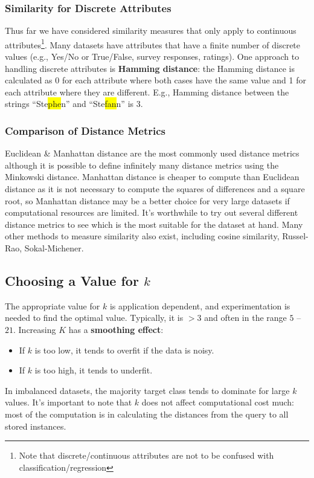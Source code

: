 \documentclass[a4paper,11pt]{article}
\begin{document}
\subsubsection{Similarity for Discrete Attributes}
Thus far we have considered similarity measures that only apply to continuous attributes\footnote{Note that discrete/continuous attributes are not to be confused with classification/regression}.
Many datasets have attributes that have a finite number of discrete values (e.g., Yes/No or True/False, survey responses, ratings).
One approach to handling discrete attributes is \textbf{Hamming distance}: the Hamming distance is calculated as 0 for each attribute where both cases have the same value and 1 for each attribute where they are different.
E.g., Hamming distance between the strings ``Ste\colorbox{yellow}{phe}n'' and ``Ste\colorbox{yellow}{fan}n'' is 3.

\subsubsection{Comparison of Distance Metrics}
Euclidean \& Manhattan distance are the most commonly used distance metrics although it is possible to define infinitely many distance metrics using the Minkowski distance.
Manhattan distance is cheaper to compute than Euclidean distance as it is not necessary to compute the squares of differences and a square root, so Manhattan distance may be a better choice for very large datasets if computational resources are limited.
It's worthwhile to try out several different distance metrics to see which is the most suitable for the dataset at hand.
Many other methods to measure similarity also exist, including cosine similarity, Russel-Rao, Sokal-Michener.

\subsection{Choosing a Value for $k$}
The appropriate value for $k$ is application dependent, and experimentation is needed to find the optimal value.
Typically, it is $> 3$ and often in the range $5$ -- $21$.
Increasing $K$ has a \textbf{smoothing effect}:
\begin{itemize}
    \item   If $k$ is too low, it tends to overfit if the data is noisy.
    \item   If $k$ is too high, it tends to underfit.
\end{itemize}

In imbalanced datasets, the majority target class tends to dominate for large $k$ values.
It's important to note that $k$ does not affect computational cost much: most of the computation is in calculating the distances from the query to all stored instances.
\end{document}
